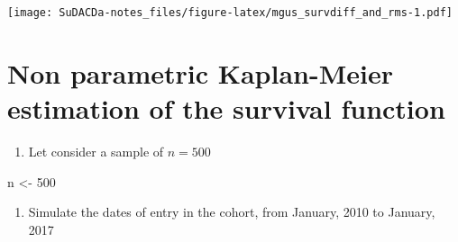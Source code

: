 \documentclass[]{book}
\newenvironment{Shaded}{\begin{snugshade}}{\end{snugshade}}
\newcommand{\KeywordTok}[1]{\textcolor[rgb]{0.13,0.29,0.53}{\textbf{{#1}}}}
\newcommand{\DataTypeTok}[1]{\textcolor[rgb]{0.13,0.29,0.53}{{#1}}}
\newcommand{\DecValTok}[1]{\textcolor[rgb]{0.00,0.00,0.81}{{#1}}}
\newcommand{\FloatTok}[1]{\textcolor[rgb]{0.00,0.00,0.81}{{#1}}}
\newcommand{\StringTok}[1]{\textcolor[rgb]{0.31,0.60,0.02}{{#1}}}
\newcommand{\CommentTok}[1]{\textcolor[rgb]{0.56,0.35,0.01}{\textit{{#1}}}}
\newcommand{\OtherTok}[1]{\textcolor[rgb]{0.56,0.35,0.01}{{#1}}}
\newcommand{\NormalTok}[1]{{#1}}
\providecommand{\tightlist}{%
  \setlength{\itemsep}{0pt}\setlength{\parskip}{0pt}}
\theoremstyle{definition}
\theoremstyle{definition}
\theoremstyle{definition}
\theoremstyle{remark}
\begin{document}
\begin{Shaded}
\end{Shaded}

\texttt{[image: SuDACDa-notes\_files/figure-latex/mgus\_survdiff\_and\_rms-1.pdf]}

\section{Non parametric Kaplan-Meier estimation of the survival
function}\label{non-parametric-kaplan-meier-estimation-of-the-survival-function}

\begin{enumerate}
\def\labelenumi{\arabic{enumi}.}
\tightlist
\item
  Let consider a sample of \(n = 500\)
\end{enumerate}

\begin{Shaded}
\begin{Highlighting}[]
\NormalTok{n <-}\StringTok{ }\DecValTok{500}
\end{Highlighting}
\end{Shaded}

\begin{enumerate}
\def\labelenumi{\arabic{enumi}.}
\setcounter{enumi}{1}
\tightlist
\item
  Simulate the dates of entry in the cohort, from January, 2010 to
  January, 2017
\end{enumerate}

\begin{Shaded}
\end{Shaded}
\end{document}
